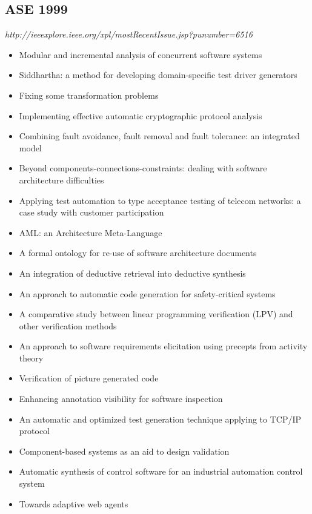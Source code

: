 \subsection{ASE 1999}

{\small \em http://ieeexplore.ieee.org/xpl/mostRecentIssue.jsp?punumber=6516}

{\small
\begin{itemize}[itemsep=-1ex]
  \item Modular and incremental analysis of concurrent software systems
  \item Siddhartha: a method for developing domain-specific test driver generators
  \item Fixing some transformation problems
  \item Implementing effective automatic cryptographic protocol analysis
  \item Combining fault avoidance, fault removal and fault tolerance: an integrated model
  \item Beyond components-connections-constraints: dealing with software architecture difficulties
  \item Applying test automation to type acceptance testing of telecom networks: a case study with customer participation
  \item AML: an Architecture Meta-Language
  \item A formal ontology for re-use of software architecture documents
  \item An integration of deductive retrieval into deductive synthesis
  \item An approach to automatic code generation for safety-critical systems
  \item A comparative study between linear programming verification (LPV) and other verification methods
  \item An approach to software requirements elicitation using precepts from activity theory
  \item Verification of picture generated code
  \item Enhancing annotation visibility for software inspection
  \item An automatic and optimized test generation technique applying to TCP/IP protocol
  \item Component-based systems as an aid to design validation
  \item Automatic synthesis of control software for an industrial automation control system
  \item Towards adaptive web agents

\end{itemize}}
